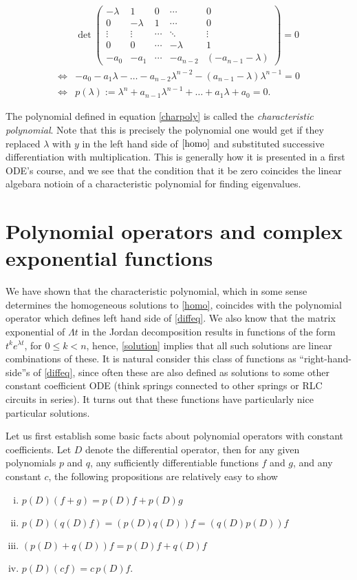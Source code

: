 \documentclass{amsart} %
\begin{document}
\begin{align}
  &\det\begin{pmatrix}
    -\lambda & 1 & 0 & \cdots & 0 \\
    0 & -\lambda & 1 & \cdots & 0 \\
    \vdots & \vdots & \cdots & \ddots & \vdots \\
    0 & 0 & \cdots & -\lambda & 1\\
    -a_0 & -a_1 & \cdots & -a_{n-2} & (-a_{n-1}-\lambda)
  \end{pmatrix} = 0 \nonumber\\
  \iff&
  -a_0 -a_1\lambda - \dots - a_{n-2}\lambda^{n-2} - (a_{n-1} -\lambda)\lambda^{n-1} = 0 \nonumber\\
  \iff&p(\lambda) := \lambda^n + a_{n-1}\lambda^{n-1} + \dots + a_1 \lambda + a_0 = 0. \label{charpoly}
\end{align}

The polynomial defined in equation \eqref{charpoly} is called the
\emph{characteristic polynomial}.  Note that this is precisely the polynomial
one would get if they replaced $\lambda$ with $y$ in the left hand side of
$\eqref{homo}$ and substituted successive differentiation with multiplication.
This is generally how it is presented in a first ODE's course, and we see that the condition that it be zero
 coincides the linear algebara notioin of a characteristic polynomial for finding eigenvalues.   

\section{Polynomial operators and complex exponential functions}

We have shown that the characteristic polynomial, which in some sense determines
the homogeneous solutions to \eqref{homo}, coincides with the polynomial
operator which defines left hand side of \eqref{diffeq}.  We also know that the
matrix exponential of $\Lambda t$ in the Jordan decomposition results in
functions of the form $t^k e^{\lambda t}$, for $0\le k < n$, hence,
\eqref{solution} implies that all such solutions are linear combinations of
these.  It is natural consider this class of functions as ``right-hand-side''s
of \eqref{diffeq}, since often these are also defined as solutions to some other constant coefficient ODE
(think springs connected to other springs or RLC circuits in series).  It turns out
that these functions have particularly nice particular solutions.

Let us first establish some basic facts about polynomial operators with
constant coefficients. Let $D$ denote the differential operator, then for any
given polynomials $p$ and $q$, any sufficiently differentiable functions $f$
and $g$, and any constant $c$, the following propositions are relatively easy to show 
\begin{enumerate}[(i)] 
\item $p(D)(f + g) = p(D)f + p(D)g$
\item $p(D)(q(D)f) = (p(D)q(D)) f = (q(D)p(D)) f$
\item $(p(D) + q(D))f = p(D)f + q(D)f$
\item $p(D)(cf) = c\,p(D) f$.
\end{enumerate}
\end{document}
